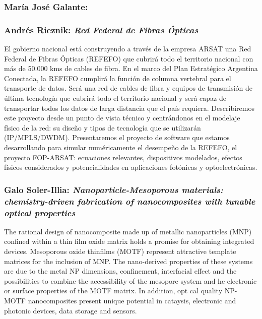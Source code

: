 \subsubsection*{Mar\'ia Jos\'e Galante: }

\subsubsection*{Andr\'es Rieznik: \textit{Red Federal de Fibras \'Opticas}}

El gobierno nacional est\'a construyendo a trav\'es de la empresa ARSAT una Red
Federal de Fibras \'Opticas (REFEFO) que cubrir\'a todo el territorio nacional
con m\'as de 50.000 kms de cables de fibra. En el marco del Plan Estrat\'egico
Argentina Conectada, la REFEFO cumplir\'a la funci\'on de columna vertebral para
el transporte de datos. Ser\'a una red de cables de fibra y equipos de
transmisi\'on de \'ultima tecnolog\'ia que cubrir\'a todo el territorio nacional
y ser\'a capaz de transportar todos los datos de larga distancia que el pa\'is
requiera. Describiremos este proyecto desde un punto de vista t\'ecnico y
centr\'andonos en el modelaje f\'isico de la red: su diseño y tipos de
tecnolog\'ia que se utilizar\'an (IP/MPLS/DWDM). Presentaremos el proyecto de
software que estamos desarrollando para simular num\'ericamente el desempeño de
la REFEFO, el proyecto FOP-ARSAT: ecuaciones relevantes, dispositivos modelados,
efectos f\'isicos considerados y potencialidades en aplicaciones fot\'onicas y
optoelectr\'onicas.

\subsubsection*{Galo Soler-Illia: \textit{Nanoparticle-Mesoporous materials:
chemistry-driven fabrication of nanocomposites with tunable optical properties}}

The rational design of nanocomposite made up of metallic nanoparticles
(MNP) confined within a thin film oxide matrix holds a promise for obtaining
integrated devices. Mesoporous oxide thinfilms (MOTF) represent attractive
template matrices for the inclusion of MNP. The nano-derived properties of these
systems are due to the metal NP dimensions, confinement, interfacial effect
 and the possibilities to combine the accessibility of the mesopore system and 
he electronic or surface properties of the MOTF matrix. In addition,  opt
cal quality NP-MOTF nanocomposites present unique potential in cataysis,
electronic and photonic devices, data storage and sensors.              

